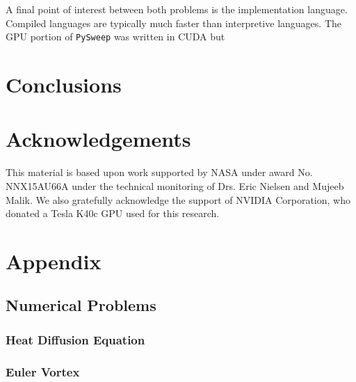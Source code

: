 \documentclass[review]{elsarticle}
\def\pysweep{\texttt{PySweep}}
\begin{document}
\par
A final point of interest between both problems is the implementation language. Compiled languages are typically much faster than interpretive languages. The GPU portion of \pysweep{} was written in CUDA but




\section{Conclusions}
\label{conclusions-section}



\section{Acknowledgements}
This material is based upon work supported by NASA under award No. NNX15AU66A under the technical monitoring of Drs. Eric Nielsen and Mujeeb Malik. We also gratefully acknowledge the support of NVIDIA Corporation, who donated a
Tesla K40c GPU used for this research.




\section{Appendix}
\label{appendices}
\subsection{Numerical Problems}
\subsubsection{Heat Diffusion Equation}
\subsubsection{Euler Vortex}

\label{AppendixA}
\end{document}
